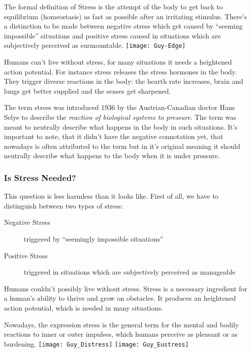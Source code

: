 \documentclass[../main.tex]{subfiles}
\begin{document}
The formal definition of Stress is the attempt of the body to get back to equilibrium (homeostasis) as fast as possible after an irritating stimulus.
There's a distinction to be made between negative stress which get caused by ``seeming impossible''
 situations and positive stress caused in situations which are subjectively perceived as surmountable.
\texttt{[image: Guy-Edge]}

Humans can't live without stress, for many situations it needs a heightened action potential. For instance stress releases the stress hormones in the body. They trigger diverse reactions in the body: the hearth rate increases, brain and lungs get better supplied and the senses get sharpened.

The term stress was introduced 1936 by the Austrian-Canadian doctor Hans Selye to describe the \emph{reaction of biological systems to pressure}. The term was meant to neutrally describe what happens in the body in such situations.
It's important to note, that it didn't have the negative connotation yet, that nowadays is often attributed to the term but in it's original meaning it should neutrally describe what happens to the body when it is under pressure.

\subsubsection{Is Stress Needed?}

This question is less harmless than it looks like. First of all, we have to distinguish between two types of stress:
	\begin{description}
		\item[Negative Stress] triggered by ``seemingly impossible situations''
		\item[Positive Stress] triggered in situations which are subjectively perceived as manageable
	\end{description}
	
Humans couldn't possibly live without stress. Stress is a necessary ingredient for a human's ability to thrive and grow on obstacles. It produces an heightened action potential, which is needed in many situations.

Nowadays, the expression stress is the general term for the mental and bodily reactions to inner or outer impulses, which humans perceive as pleasant or as burdening.
\texttt{[image: Guy\_Distress]}
\hspace{5cm}
\texttt{[image: Guy\_Eustress]}
\end{document}
